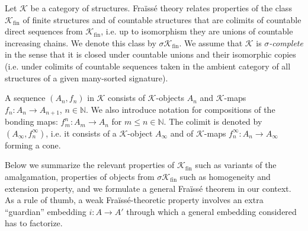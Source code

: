 \documentclass[10pt,a4paper]{article}
\theoremstyle{definition}
\theoremstyle{remark}
\newcommand \maps {\colon} %
\newcommand \sig {\sigma}
\newcommand \N {\mathbb{N}}
\newcommand \K {\mathscr{K}}
\newcommand \fin {{\operatorname{fin}}}
\begin{document}
Let $\K$ be a category of structures.
Fraïssé theory relates properties of the class $\K_\fin$ of finite structures and of countable structures that are colimits of countable direct sequences from $\K_\fin$, i.e. up to isomorphism they are unions of countable increasing chains.
We denote this class by $\sig\K_\fin$.
We assume that $\K$ is \emph{$\sigma$-complete} in the sense that it is closed under countable unions and their isomorphic copies (i.e. under colimits of countable sequences taken in the ambient category of all structures of a given many-sorted signature).

A sequence $(A_n, f_n)$ in $\K$ consists of $\K$-objects $A_n$ and $\K$-maps $f_n\maps A_n \to A_{n + 1}$, $n \in \N$.
We also introduce notation for compositions of the bonding maps: $f_m^n\maps A_m \to A_n$ for $m \leq n \in \N$.
The colimit is denoted by $(A_\infty, f^\infty_n)$, i.e. it consists of a $\K$-object $A_\infty$ and of $\K$-maps $f_n^\infty\maps A_n \to A_\infty$ forming a cone.

Below we summarize the relevant properties of $\K_\fin$ such as variants of the amalgamation, properties of objects from $\sig\K_\fin$ such as homogeneity and extension property, and we formulate a general Fraïssé theorem in our context.
As a rule of thumb, a weak Fraïssé-theoretic property involves an extra ``guardian'' embedding $i\maps A \to A'$ through which a general embedding considered has to factorize.
\end{document}
